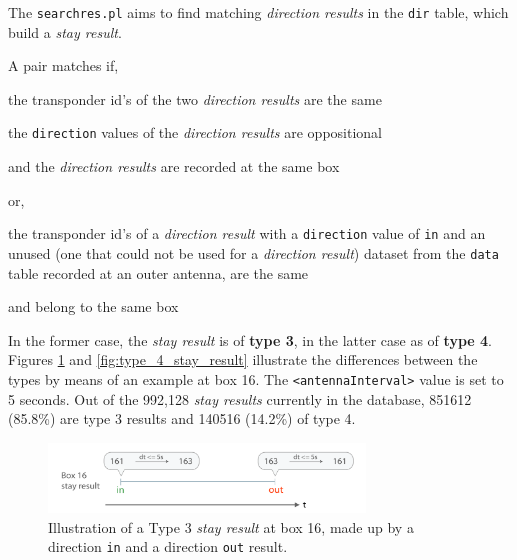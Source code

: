 The \lstinline|searchres.pl| aims to find matching \textit{direction results} in the \lstinline|dir| table, which build a \textit{stay result}.

A pair matches if,

\begin{mylist}
\item the transponder id's of the two \textit{direction results} are the same
\item the \lstinline|direction| values of the \textit{direction results} are oppositional
\item and the \textit{direction results} are recorded at the same box
\end{mylist}

or,

\begin{mylist}
\item the transponder id's of a \textit{direction result} with a \lstinline|direction| value of \lstinline|in| and an unused (one that could not be used for a \textit{direction result}) dataset from the \lstinline|data| table recorded at an outer antenna, are the same
\item and belong to the same box
\end{mylist}

In the former case, the \textit{stay result} is of \textbf{type 3}, in the latter case as of \textbf{type 4}. Figures \ref{fig:type_3_stay_result} and \ref{fig:type_4_stay_result} illustrate the differences between the types by means of an example at box 16. The \lstinline|<antennaInterval>| value is set to 5 seconds. Out of the 992,128 \textit{stay results} currently in the database, 851612 (85.8\%) are type 3 results and 140516 (14.2\%) of type 4.

\begin{figure}[htpb]
\begin{center}
  \includegraphics[width=0.75\textwidth]{assets/pdf/stay_result_type_3_schema.pdf}
  \caption[Illustration of a type 3 \textit{stay result}]{Illustration of a Type 3 \textit{stay result} at box 16,  made up by a direction \lstinline|in| and a direction \lstinline|out| result.}
  \label{fig:type_3_stay_result}
\end{center}
\end{figure}

